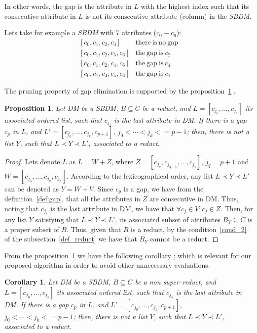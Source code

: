 \documentclass[number,preprint,review,12pt]{elsarticle}
\newtheorem{proposition}{Proposition}
\newtheorem{proof}{Proof}
\newtheorem{corollary}{Corollary}
\begin{document}
	In other words, the gap is the attribute in $L$ with the highest index such that its consecutive attribute in $L$ is not its consecutive attribute (column) in the \textit{SBDM}.
	
	Lets take for example a \textit{SBDM} with 7 attributes ($c_0 - c_6$):
	$$\begin{array}{ll}
	{[c_0,c_1,c_2,c_3]} 		& \mathrm{there~is~no~gap}\\
	{[c_0,c_1,c_2,c_5,c_6]} 	& \mathrm{the~gap~is~} c_2\\
	{[c_0,c_1,c_2,c_4,c_6]} 	& \mathrm{the~gap~is~} c_4\\
	{[c_0,c_1,c_4,c_5,c_6]} 	& \mathrm{the~gap~is~} c_1
	\end{array}$$


	The pruning property of gap elimination is supported by the proposition~\ref{prop:gap} \citep{Santiesteban03}. 
		
	\begin{proposition}\label{prop:gap} 
		Let DM be a SBDM, $B \subseteq C$ be a reduct, and $L = [c_{j_0},...,c_{j_s}]$ its associated ordered list, such that $c_{j_s}$ is the last attribute in DM. If there is a gap $c_p$ in $L$, and $L' = [c_{j_0},...,c_{j_k},c_{p+1}]$, $j_0<\cdots <j_k<=p-1$; then, there is not a list $Y$, such that $L \prec Y \prec L'$, associated to a reduct.
	\end{proposition}	
	
	\begin{proof}
		Lets denote $L$ as $L=W+Z$, where $Z=[c_{j_q},c_{j_{q+1}}, \dots, c_{j_s}]$, $j_q=p+1$ and $W=[c_{j_0}, \dots,c_{j_k}, c_{j_p}]$. According to the lexicographical order, any list $L \prec Y \prec L'$ can be denoted as $Y=W+V$. Since $c_p$ is a gap, we have from the definition~\ref{def:gap}, that all the attributes in $Z$ are consecutive in DM. Thus, noting that $c_{j_s}$ is the last attribute in DM, we have that $\forall c_j \in V: c_j \in Z$. Then, for any list $Y$ satisfying that $L \prec Y \prec L'$, its associated subset of attributes $B_Y \subseteq C$ is a proper subset of $B$. Thus, given that $B$ is a reduct, by the condition~\ref{cond_2} of the subsection~\ref{def_reduct} we have that $B_Y$ cannot be a reduct.
	\end{proof}
	
	From the proposition~\ref{prop:gap} we have the following corollary \citep{Santiesteban03}; which is relevant for our proposed algorithm in order to avoid other unnecessary evaluations.
	
	\begin{corollary}\label{coro:gap} 
		Let DM be a SBDM, $B \subseteq C$ be a non super--reduct, and $L = [c_{j_0},...,c_{j_s}]$ its associated ordered list, such that $c_{j_s}$ is the last attribute in DM. If there is a gap $c_p$ in $L$, and $L' = [c_{j_0},...,c_{j_k},c_{p+1}]$, $j_0<\cdots <j_k<=p-1$; then, there is not a list $Y$, such that $L \prec Y \prec L'$, associated to a reduct.
	\end{corollary}
		
\end{document}
